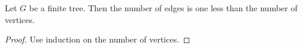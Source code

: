 \begin{theorem}
Let $G$ be a finite tree. Then the number of edges is one less than the number of vertices.
\end{theorem}

\begin{proof}
Use induction on the number of vertices.
\end{proof}
